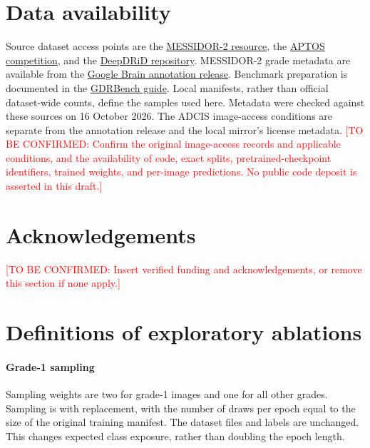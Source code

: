 \documentclass[a4paper,fleqn]{cas-sc}
\newcommand{\tbc}[1]{\textcolor{red}{[TO BE CONFIRMED: #1]}}
\begin{document}
\section*{Data availability}
Source dataset access points are the \href{https://www.adcis.net/en/third-party/messidor2/}{MESSIDOR-2 resource}, the \href{https://www.kaggle.com/competitions/aptos2019-blindness-detection}{APTOS competition}, and the \href{https://github.com/deepdrdoc/DeepDRiD}{DeepDRiD repository}. MESSIDOR-2 grade metadata are available from the \href{https://www.kaggle.com/datasets/google-brain/messidor2-dr-grades}{Google Brain annotation release}. Benchmark preparation is documented in the \href{https://github.com/chehx/DGDR/tree/main/GDRBench}{GDRBench guide}. Local manifests, rather than official dataset-wide counts, define the samples used here. Metadata were checked against these sources on 16 October 2026. The ADCIS image-access conditions are separate from the annotation release and the local mirror's license metadata. \tbc{Confirm the original image-access records and applicable conditions, and the availability of code, exact splits, pretrained-checkpoint identifiers, trained weights, and per-image predictions. No public code deposit is asserted in this draft.}

\section*{Acknowledgements}
\tbc{Insert verified funding and acknowledgements, or remove this section if none apply.}

\appendix
\section{Definitions of exploratory ablations}
\label{app:ablations}

\paragraph{Grade-1 sampling}
Sampling weights are two for grade-1 images and one for all other grades. Sampling is with replacement, with the number of draws per epoch equal to the size of the original training manifest. The dataset files and labels are unchanged. This changes expected class exposure, rather than doubling the epoch length.
\end{document}
